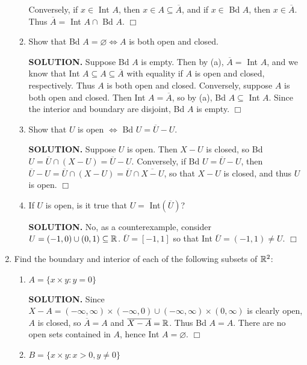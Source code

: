 \documentclass{article}
\begin{document}
\begin{enumerate}
\begin{enumerate}
            Conversely, if $x \in $ Int $A$, then $x\in A \subseteq \overline{A}$, and if $x \in $ Bd $A$, then $x \in \overline{A}.$ Thus $\overline{A} = $ Int $A\cap $ Bd $A$. $\Box$
            
            \item Show that Bd $A = \varnothing \iff A$ is both open and closed.

            {\bf SOLUTION.} Suppose Bd $A$ is empty. Then by (a), $\overline{A} = $ Int $A$, and we know that Int $A \subseteq A \subseteq \overline{A}$ with equality if $A$ is open and closed, respectively. Thus $A$ is both open and closed. Conversely, suppose $A$ is both open and closed. Then Int $A = \overline{A}$, so by (a), Bd $A \subseteq $ Int $A$. Since the interior and boundary are disjoint, Bd $A$ is empty. $\Box$
            
            \item Show that $U$ is open $\iff$ Bd $U = \overline{U} - U$.

            {\bf SOLUTION.} Suppose $U$ is open. Then $X-U$ is closed, so Bd $U = \overline{U} \cap (X-U) = \overline{U} - U$. Conversely, if Bd $U = \overline{U} - U$, then $\overline{U} - U = \overline{U} \cap (X-U) = \overline{U} \cap \overline{X-U}$, so that $X-U$ is closed, and thus $U$ is open. $\Box$
            
            \item If $U$ is open, is it true that $U = $ Int$(\overline{U})$?

            {\bf SOLUTION.} No, as a counterexample, consider $U = (-1, 0) \cup (0, 1) \subseteq \mathbb{R}$. $\overline{U} = [-1, 1]$ so that Int $\overline{U} = (-1, 1) \neq U$. $\Box$
        \end{enumerate}

    \item Find the boundary and interior of each of the following subsets of $\mathbb{R}^2$:
        \begin{enumerate}
            \item $A = \{x \times y: y = 0\}$

            {\bf SOLUTION.} Since $X-A = (-\infty, \infty) \times (-\infty, 0) \cup (-\infty, \infty) \times (0, \infty)$ is clearly open, $A$ is closed, so $\overline{A} = A$ and $\overline{X-A} = \mathbb{R}$. Thus Bd $A = A$. There are no open sets contained in $A$, hence Int $A = \varnothing$. $\Box$
            
            \item $B = \{x \times y: x > 0, y \neq 0\}$


\end{enumerate}
\end{enumerate}
\end{document}
